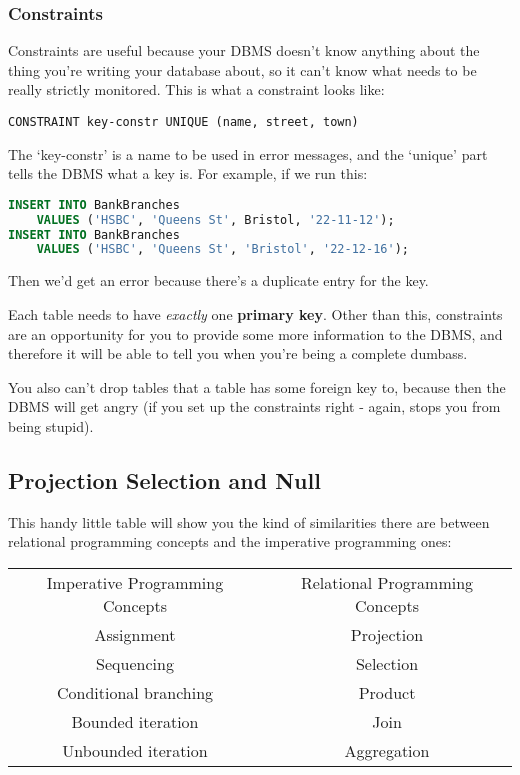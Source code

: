 \documentclass[11pt,a4paper,titlepage,dvipsnames,cmyk]{scrartcl}
\begin{document}
\subsubsection{Constraints}%
\label{ssub:Constraints}
Constraints are useful because your DBMS doesn't know anything about the
thing you're writing your database about, so it can't know what needs to
be really strictly monitored. This is what a constraint looks like:

\begin{lstlisting}[]
CONSTRAINT key-constr UNIQUE (name, street, town)
\end{lstlisting}

The `key-constr' is a name to be used in error messages, and the `unique'
part tells the DBMS what a key is. For example, if we run this:

\begin{lstlisting}[language=SQL]
INSERT INTO BankBranches
    VALUES ('HSBC', 'Queens St', Bristol, '22-11-12');
INSERT INTO BankBranches
    VALUES ('HSBC', 'Queens St', 'Bristol', '22-12-16');
\end{lstlisting}

Then we'd get an error because there's a duplicate entry for the key.

Each table needs to have \textit{exactly} one \textbf{primary key}. Other
than this, constraints are an opportunity for you to provide some more
information to the DBMS, and therefore it will be able to tell you when
you're being a complete dumbass.

You also can't drop tables that a table has some foreign key to, because
then the DBMS will get angry (if you set up the constraints right - again,
stops you from being stupid).

\begin{minipage}{\textwidth}
\subsection{Projection Selection and Null}%
\label{sub:projection}
This handy little table will show you the kind of similarities there are
between relational programming concepts and the imperative programming
ones:

\begin{center}
    \begin{tabular}{c|c}
        Imperative Programming Concepts & Relational Programming Concepts
        \\
        \hhline{=|=}
        Assignment & Projection \\
        Sequencing & Selection \\
        Conditional branching & Product \\
        Bounded iteration & Join \\
        Unbounded iteration & Aggregation
    \end{tabular}
\end{center}
\end{minipage}
\end{document}
